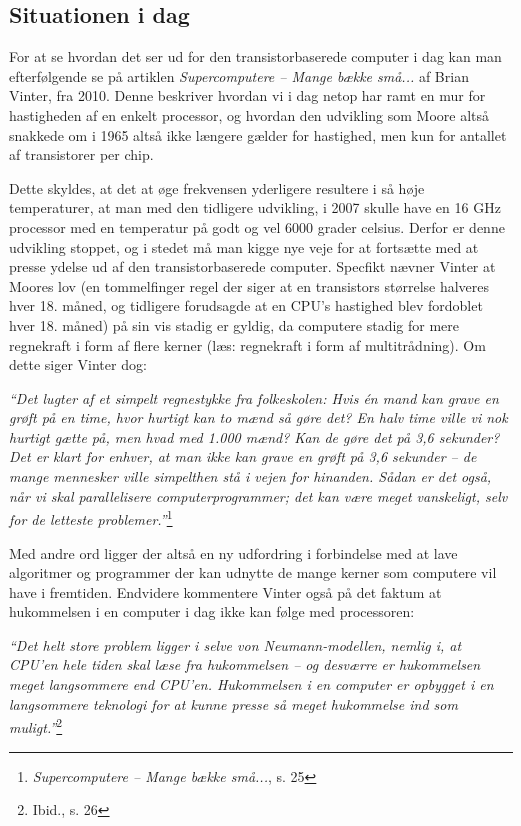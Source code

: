 \documentclass[10pt,a4paper]{article}
\newcommand{\citat}[2]{\begin{justify}\textit{``#1''}\hspace{0.1cm}\footnote{#2}\end{justify}}
\begin{document}
\subsection{Situationen i dag}
For at se hvordan det ser ud for den transistorbaserede computer i dag kan man efterfølgende se på artiklen \textit{Supercomputere -- Mange bække små...} af Brian Vinter, fra 2010. Denne beskriver hvordan vi i dag netop har ramt en mur for hastigheden af en enkelt processor, og hvordan den udvikling som Moore altså snakkede om i 1965 altså ikke længere gælder for hastighed, men kun for antallet af transistorer per chip.

Dette skyldes, at det at øge frekvensen yderligere resultere i så høje temperaturer, at man med den tidligere udvikling, i 2007 skulle have en 16 GHz processor med en temperatur på godt og vel 6000 grader celsius. Derfor er denne udvikling stoppet, og i stedet må man kigge nye veje for at fortsætte med at presse ydelse ud af den transistorbaserede computer. Specfikt nævner Vinter at Moores lov (en tommelfinger regel der siger at en transistors størrelse halveres hver 18. måned, og tidligere forudsagde at en CPU's hastighed blev fordoblet hver 18. måned) på sin vis stadig er gyldig, da computere stadig for mere regnekraft i form af flere kerner (læs: regnekraft i form af multitrådning). Om dette siger Vinter dog:
\citat{Det lugter af et simpelt regnestykke fra folkeskolen: Hvis én mand kan grave en grøft på en time, hvor hurtigt kan to mænd så gøre det? En halv time ville vi nok hurtigt gætte på, men hvad med 1.000 mænd? Kan de gøre det på 3,6 sekunder? Det er klart for enhver, at man ikke kan grave en grøft på 3,6 sekunder – de mange mennesker ville simpelthen stå i vejen for hinanden. Sådan er det også, når vi skal parallelisere computerprogrammer; det kan være meget vanskeligt, selv for de letteste problemer.}{\textit{Supercomputere -- Mange bække små...}, s. 25}

Med andre ord ligger der altså en ny udfordring i forbindelse med at lave algoritmer og programmer der kan udnytte de mange kerner som computere vil have i fremtiden. Endvidere kommentere Vinter også på det faktum at hukommelsen i en computer i dag ikke kan følge med processoren:
\citat{Det helt store problem ligger i selve von Neumann-modellen, nemlig i, at CPU’en hele tiden skal læse fra hukommelsen -- og desværre er hukommelsen
meget langsommere end CPU’en. Hukommelsen i en computer er opbygget i en langsommere teknologi for at kunne presse så meget hukommelse ind som muligt.}{Ibid., s. 26}
\end{document}
